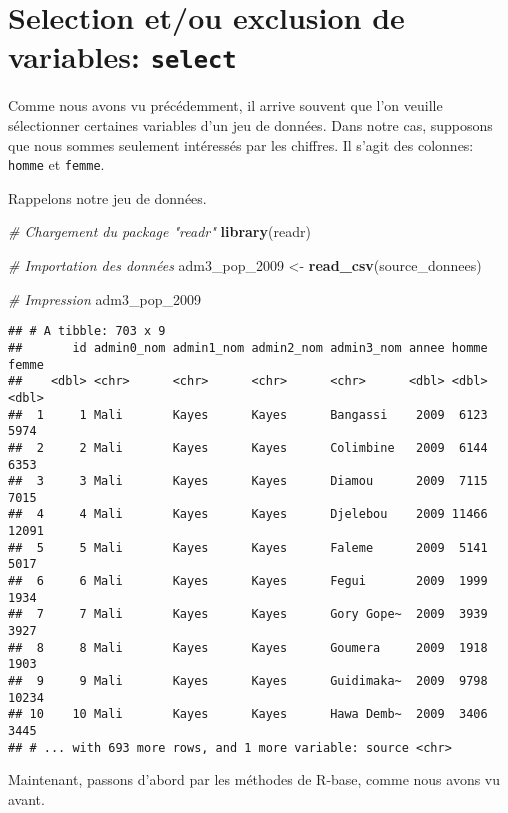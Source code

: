 \documentclass[]{book}
\newenvironment{Shaded}{\begin{snugshade}}{\end{snugshade}}
\newcommand{\KeywordTok}[1]{\textcolor[rgb]{0.13,0.29,0.53}{\textbf{#1}}}
\newcommand{\DecValTok}[1]{\textcolor[rgb]{0.00,0.00,0.81}{#1}}
\newcommand{\StringTok}[1]{\textcolor[rgb]{0.31,0.60,0.02}{#1}}
\newcommand{\CommentTok}[1]{\textcolor[rgb]{0.56,0.35,0.01}{\textit{#1}}}
\newcommand{\NormalTok}[1]{#1}
\begin{document}
\section{\texorpdfstring{Selection et/ou exclusion de variables:
\texttt{select}}{Selection et/ou exclusion de variables: select}}\label{selection-etou-exclusion-de-variables-select}

Comme nous avons vu précédemment, il arrive souvent que l'on veuille
sélectionner certaines variables d'un jeu de données. Dans notre cas,
supposons que nous sommes seulement intéressés par les chiffres. Il
s'agit des colonnes: \texttt{homme} et \texttt{femme}.

Rappelons notre jeu de données.

\begin{Shaded}
\begin{Highlighting}[]
\CommentTok{# Chargement du package "readr"}
\KeywordTok{library}\NormalTok{(readr)}

\CommentTok{# Importation des données}
\NormalTok{adm3_pop_}\DecValTok{2009}\NormalTok{ <-}\StringTok{ }\KeywordTok{read_csv}\NormalTok{(source_donnees)}

\CommentTok{# Impression}
\NormalTok{adm3_pop_}\DecValTok{2009}
\end{Highlighting}
\end{Shaded}

\begin{verbatim}
## # A tibble: 703 x 9
##       id admin0_nom admin1_nom admin2_nom admin3_nom annee homme femme
##    <dbl> <chr>      <chr>      <chr>      <chr>      <dbl> <dbl> <dbl>
##  1     1 Mali       Kayes      Kayes      Bangassi    2009  6123  5974
##  2     2 Mali       Kayes      Kayes      Colimbine   2009  6144  6353
##  3     3 Mali       Kayes      Kayes      Diamou      2009  7115  7015
##  4     4 Mali       Kayes      Kayes      Djelebou    2009 11466 12091
##  5     5 Mali       Kayes      Kayes      Faleme      2009  5141  5017
##  6     6 Mali       Kayes      Kayes      Fegui       2009  1999  1934
##  7     7 Mali       Kayes      Kayes      Gory Gope~  2009  3939  3927
##  8     8 Mali       Kayes      Kayes      Goumera     2009  1918  1903
##  9     9 Mali       Kayes      Kayes      Guidimaka~  2009  9798 10234
## 10    10 Mali       Kayes      Kayes      Hawa Demb~  2009  3406  3445
## # ... with 693 more rows, and 1 more variable: source <chr>
\end{verbatim}

Maintenant, passons d'abord par les méthodes de R-base, comme nous avons
vu avant.
\end{document}
